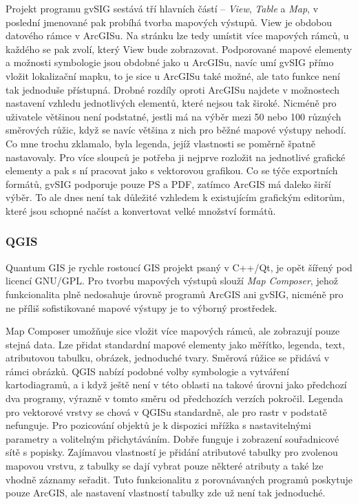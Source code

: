 \documentclass[a4paper,12pt,draft]{article}
\begin{document}
Projekt programu gvSIG sestává tří hlavních částí -- \emph{View},
\emph{Table} a \emph{Map}, v poslední jmenované pak probíhá tvorba
mapových výstupů. View je obdobou datového rámce v ArcGISu. Na stránku
lze tedy umístit více mapových rámců, u každého se pak zvolí,
který View bude zobrazovat. Podporované mapové elementy a možnosti
symbologie jsou obdobné
jako u ArcGISu, navíc umí gvSIG přímo vložit lokalizační mapku,
to je sice u ArcGISu také možné, ale tato funkce není tak jednoduše
přístupná. Drobné rozdíly oproti ArcGISu najdete v možnostech nastavení
vzhledu
jednotlivých elementů, které nejsou tak široké. Nicméně pro uživatele
většinou
není podstatné, jestli má na výběr mezi 50 nebo 100 různých směrových
růžic,
když se navíc  většina z nich  pro běžné mapové výstupy nehodí.
Co mne trochu zklamalo,
byla legenda, jejíž vlastnosti se poměrně špatně nastavovaly. Pro
více sloupců je potřeba ji nejprve rozložit na jednotlivé grafické
elementy a pak s ní pracovat jako s vektorovou grafikou. Co se týče
exportních formátů, gvSIG podporuje pouze PS a PDF, zatímco ArcGIS
má daleko širší výběr. To ale dnes není tak důležité vzhledem
k existujícím grafickým editorům, které jsou schopné načíst a
konvertovat velké množství formátů.

\subsubsection{QGIS}
Quantum GIS je rychle rostoucí GIS projekt psaný v C++/Qt, je opět
šířený
pod licencí GNU/GPL. Pro tvorbu mapových výstupů slouží \emph{Map
Composer}, jehož funkcionalita plně nedosahuje úrovně programů ArcGIS
ani gvSIG, nicméně pro ne příliš sofistikované mapové výstupy je to
výborný prostředek.

Map Composer umožňuje sice vložit více mapových rámců, ale
zobrazují pouze stejná data. Lze přidat standardní mapové elementy
jako měřítko, legenda, text, atributovou tabulku, obrázek, jednoduché
tvary. Směrová růžice se přidává v rámci obrázků.
QGIS nabízí podobné volby symbologie a vytváření kartodiagramů,
a i když
ještě není v této oblasti na takové úrovni jako předchozí dva
programy, výrazně
v tomto směru od předchozích verzích pokročil.
Legenda pro vektorové vrstvy se chová v QGISu standardně, ale
pro rastr v podstatě nefunguje. Pro pozicování objektů je k dispozici
mřížka s nastavitelnými parametry a volitelným přichytáváním. Dobře
funguje i zobrazení souřadnicové sítě s popisky. Zajímavou
vlastností je přidání atributové tabulky pro zvolenou mapovou
vrstvu, z tabulky se dají vybrat pouze některé atributy a také lze
vhodně záznamy seřadit. Tuto funkcionalitu z porovnávaných programů
poskytuje pouze ArcGIS, ale nastavení vlastností tabulky zde už není
tak jednoduché.
\end{document}
